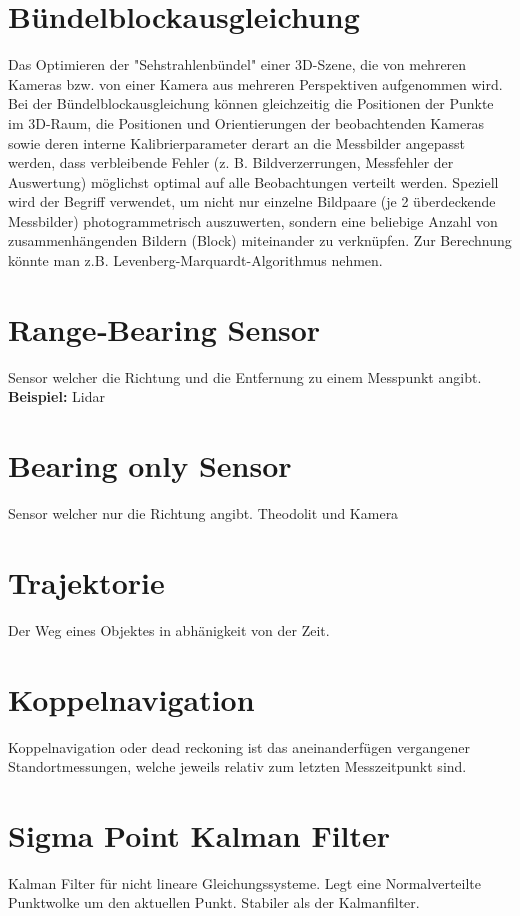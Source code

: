 \section{Bündelblockausgleichung}
\label{uebersicht:sec:Bündelblockausgleichung}
	Das Optimieren der "Sehstrahlenbündel" einer 3D-Szene, die von mehreren Kameras bzw. von einer Kamera aus mehreren Perspektiven
	aufgenommen wird. Bei der Bündelblockausgleichung können gleichzeitig die Positionen der Punkte im 3D-Raum, die Positionen und
	Orientierungen der beobachtenden Kameras sowie deren interne Kalibrierparameter derart an die Messbilder angepasst werden, dass
	verbleibende Fehler (z. B. Bildverzerrungen, Messfehler der Auswertung) möglichst optimal auf alle Beobachtungen verteilt werden.
	Speziell wird der Begriff verwendet, um nicht nur einzelne Bildpaare (je 2 überdeckende Messbilder) photogrammetrisch auszuwerten,
	sondern eine beliebige Anzahl von zusammenhängenden Bildern (Block) miteinander zu verknüpfen. Zur Berechnung könnte man z.B.
	Levenberg-Marquardt-Algorithmus nehmen. 

\section{Range‐Bearing Sensor}
\label{uebersicht:sec:Range‐BearingSensor}
	Sensor welcher die Richtung und die Entfernung zu einem Messpunkt angibt. \\ \textbf{Beispiel:} Lidar

\section{Bearing only Sensor}
\label{uebersicht:sec:BearingonlySensor}
	Sensor welcher nur die Richtung angibt. Theodolit und Kamera

\section{Trajektorie}
\label{uebersicht:sec:Trajektorie}
	Der Weg eines Objektes in abhänigkeit von der Zeit.
	
\section{Koppelnavigation}
\label{uebersicht:sec:Koppelnavigation}
	Koppelnavigation oder dead reckoning ist das aneinanderfügen vergangener Standortmessungen, welche jeweils relativ zum letzten Messzeitpunkt sind.
	
\section{Sigma Point Kalman Filter}
\label{uebersicht:sec:SigmaPointKalmanFilter}
	Kalman Filter für nicht lineare Gleichungssysteme. Legt eine Normalverteilte Punktwolke um den aktuellen Punkt. Stabiler als der Kalmanfilter.

